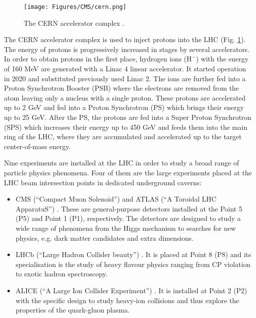 \begin{figure}[h!]
    \centering
    \texttt{[image: Figures/CMS/cern.png]}
    \caption{The CERN accelerator complex \cite{Mobs:2684277}.}
    \label{fig:cern}
\end{figure}

The CERN accelerator complex is used to inject protons into the LHC (Fig. \ref{fig:cern}). The energy of protons is progressively increased in stages by several accelerators. In order to obtain protons in the first place, hydrogen ions ($\text{H}^{-}$) with the energy of 160 MeV are generated with a Linac 4 linear accelerator. It started operation in 2020 and substituted previously used Linac 2. The ions are further fed into a Proton Synchrotron Booster (PSB) where the electrons are removed from the atom leaving only a nucleus with a single proton. These protons are accelerated up to 2 GeV and fed into a Proton Synchrotron (PS) which brings their energy up to 25 GeV. After the PS, the protons are fed into a Super Proton Synchrotron (SPS) which increases their energy up to 450 GeV and feeds them into the main ring of the LHC, where they are accumulated and accelerated up to the target center-of-mass energy.  

Nine experiments are installed at the LHC in order to study a broad range of particle physics phenomena. Four of them are the large experiments placed at the LHC beam intersection points in dedicated underground caverns:  
\begin{itemize}
    \item CMS (\enquote{Compact Muon Solenoid}) \cite{CMS:2008xjf} and ATLAS (\enquote{A Toroidal LHC ApparatuS}) \cite{ATLAS:2008xda}. These are general-purpose detectors installed at the Point 5 (P5) and Point 1 (P1), respectively. The detectors are designed to study a wide range of phenomena from the Higgs mechanism to searches for new physics, e.g. dark matter candidates and extra dimensions.
    
    \item LHCb (\enquote{Large Hadron Collider beauty}) \cite{LHCb:2008vvz}. It is placed at Point 8 (P8) and its specialisation is the study of heavy flavour physics ranging from CP violation to exotic hadron spectroscopy.  
    
    \item ALICE (\enquote{A Large Ion Collider Experiment}) \cite{ALICE:2008ngc}. It is installed at Point 2 (P2) with the specific design to study heavy-ion collisions and thus explore the properties of the quark-gluon plasma.
\end{itemize}

